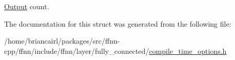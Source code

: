 \hyperlink{classffnn_1_1layer_1_1_output}{Output} count. 



The documentation for this struct was generated from the following file\-:\begin{DoxyCompactItemize}
\item 
/home/briancairl/packages/src/ffnn-\/cpp/ffnn/include/ffnn/layer/fully\-\_\-connected/\hyperlink{fully__connected_2compile__time__options_8h}{compile\-\_\-time\-\_\-options.\-h}\end{DoxyCompactItemize}
